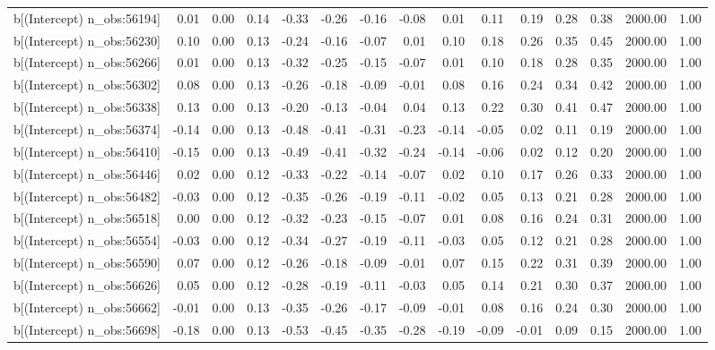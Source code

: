 \begin{table}[ht]
\begin{tabular}{rrrrrrrrrrrrrrr}
  b[(Intercept) n\_obs:56194] & 0.01 & 0.00 & 0.14 & -0.33 & -0.26 & -0.16 & -0.08 & 0.01 & 0.11 & 0.19 & 0.28 & 0.38 & 2000.00 & 1.00 \\ 
  b[(Intercept) n\_obs:56230] & 0.10 & 0.00 & 0.13 & -0.24 & -0.16 & -0.07 & 0.01 & 0.10 & 0.18 & 0.26 & 0.35 & 0.45 & 2000.00 & 1.00 \\ 
  b[(Intercept) n\_obs:56266] & 0.01 & 0.00 & 0.13 & -0.32 & -0.25 & -0.15 & -0.07 & 0.01 & 0.10 & 0.18 & 0.28 & 0.35 & 2000.00 & 1.00 \\ 
  b[(Intercept) n\_obs:56302] & 0.08 & 0.00 & 0.13 & -0.26 & -0.18 & -0.09 & -0.01 & 0.08 & 0.16 & 0.24 & 0.34 & 0.42 & 2000.00 & 1.00 \\ 
  b[(Intercept) n\_obs:56338] & 0.13 & 0.00 & 0.13 & -0.20 & -0.13 & -0.04 & 0.04 & 0.13 & 0.22 & 0.30 & 0.41 & 0.47 & 2000.00 & 1.00 \\ 
  b[(Intercept) n\_obs:56374] & -0.14 & 0.00 & 0.13 & -0.48 & -0.41 & -0.31 & -0.23 & -0.14 & -0.05 & 0.02 & 0.11 & 0.19 & 2000.00 & 1.00 \\ 
  b[(Intercept) n\_obs:56410] & -0.15 & 0.00 & 0.13 & -0.49 & -0.41 & -0.32 & -0.24 & -0.14 & -0.06 & 0.02 & 0.12 & 0.20 & 2000.00 & 1.00 \\ 
  b[(Intercept) n\_obs:56446] & 0.02 & 0.00 & 0.12 & -0.33 & -0.22 & -0.14 & -0.07 & 0.02 & 0.10 & 0.17 & 0.26 & 0.33 & 2000.00 & 1.00 \\ 
  b[(Intercept) n\_obs:56482] & -0.03 & 0.00 & 0.12 & -0.35 & -0.26 & -0.19 & -0.11 & -0.02 & 0.05 & 0.13 & 0.21 & 0.28 & 2000.00 & 1.00 \\ 
  b[(Intercept) n\_obs:56518] & 0.00 & 0.00 & 0.12 & -0.32 & -0.23 & -0.15 & -0.07 & 0.01 & 0.08 & 0.16 & 0.24 & 0.31 & 2000.00 & 1.00 \\ 
  b[(Intercept) n\_obs:56554] & -0.03 & 0.00 & 0.12 & -0.34 & -0.27 & -0.19 & -0.11 & -0.03 & 0.05 & 0.12 & 0.21 & 0.28 & 2000.00 & 1.00 \\ 
  b[(Intercept) n\_obs:56590] & 0.07 & 0.00 & 0.12 & -0.26 & -0.18 & -0.09 & -0.01 & 0.07 & 0.15 & 0.22 & 0.31 & 0.39 & 2000.00 & 1.00 \\ 
  b[(Intercept) n\_obs:56626] & 0.05 & 0.00 & 0.12 & -0.28 & -0.19 & -0.11 & -0.03 & 0.05 & 0.14 & 0.21 & 0.30 & 0.37 & 2000.00 & 1.00 \\ 
  b[(Intercept) n\_obs:56662] & -0.01 & 0.00 & 0.13 & -0.35 & -0.26 & -0.17 & -0.09 & -0.01 & 0.08 & 0.16 & 0.24 & 0.30 & 2000.00 & 1.00 \\ 
  b[(Intercept) n\_obs:56698] & -0.18 & 0.00 & 0.13 & -0.53 & -0.45 & -0.35 & -0.28 & -0.19 & -0.09 & -0.01 & 0.09 & 0.15 & 2000.00 & 1.00 \\ 

\end{tabular}
\end{table}
